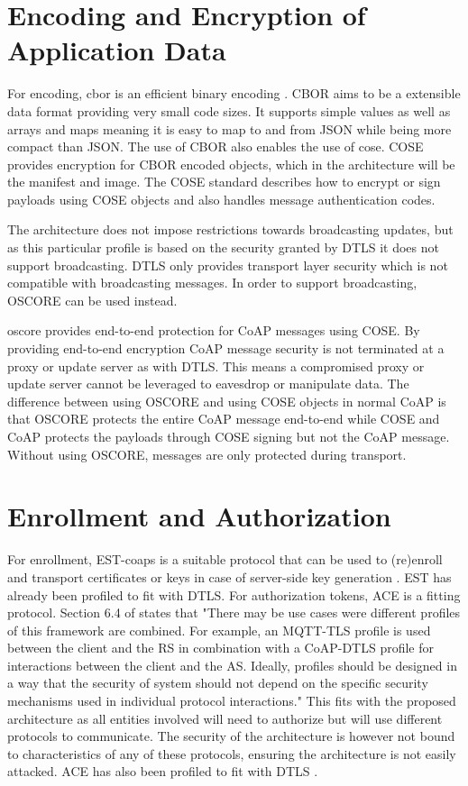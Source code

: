 \documentclass[0-thesis.tex]{subfiles}
\begin{document}
\section{Encoding and Encryption of Application Data}
\label{sec:encoding-encryption}
For encoding, \gls{cbor} is an efficient binary encoding \parencite{rfc7049}. CBOR aims to
be a extensible data format providing very small code sizes. It supports simple values as
well as arrays and maps meaning it is easy to map to and from JSON while being more
compact than JSON. The use of CBOR also enables the use of \gls{cose}. COSE provides
encryption for CBOR encoded objects, which in the architecture will be the manifest and
image. The COSE standard describes how to encrypt or sign payloads using COSE objects and
also handles message authentication codes.

The architecture does not impose restrictions towards broadcasting updates, but as this
particular profile is based on the security granted by DTLS it does not support
broadcasting. DTLS only provides transport layer security which is not compatible with
broadcasting messages. In order to support broadcasting, OSCORE can be used instead.


\gls{oscore} provides end-to-end protection for CoAP messages using COSE. By providing
end-to-end encryption CoAP message security is not terminated at a proxy or update server
as with DTLS. This means a compromised proxy or update server cannot be leveraged to
eavesdrop or manipulate data. The difference between using OSCORE and using COSE objects
in normal CoAP is that OSCORE protects the entire CoAP message end-to-end while COSE and
CoAP protects the payloads through COSE signing but not the CoAP message. Without using
OSCORE, messages are only protected during transport.

\section{Enrollment and Authorization}
\label{sec:enrollment-authorization}
For enrollment, EST-coaps is a suitable protocol that can be used to (re)enroll and
transport certificates or keys in case of server-side key generation
\parencite{est-coaps}. EST has already been profiled to fit with DTLS. For authorization
tokens, ACE is a fitting protocol. Section 6.4 of \parencite{ace} states that "There may
be use cases were different profiles of this framework are combined.  For example, an
MQTT-TLS profile is used between the client and the RS in combination with a CoAP-DTLS
profile for interactions between the client and the AS.  Ideally, profiles should be
designed in a way that the security of system should not depend on the specific security
mechanisms used in individual protocol interactions." This fits with the proposed
architecture as all entities involved will need to authorize but will use different
protocols to communicate. The security of the architecture is however not bound to
characteristics of any of these protocols, ensuring the architecture is not easily
attacked. ACE has also been profiled to fit with DTLS \parencite{ace-dtls-profile}.
\end{document}
